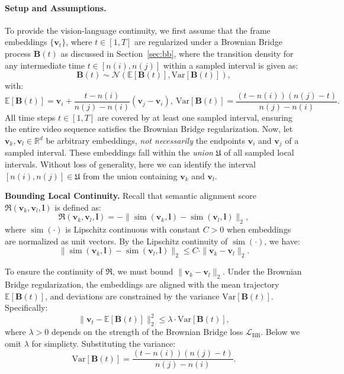 \paragraph{Setup and Assumptions.}
To provide the vision-language continuity, we first assume that the frame embeddings $\{\mathbf{v}_t\}$, where $t\in[1, T]$ are regularized under a Brownian Bridge process $\mathbf{B}(t)$ as discussed in Section~\ref{sec:bb}, where the transition density for any intermediate time $t \in [n(i), n(j)]$ within a sampled interval is given as:
\begin{equation}
\mathbf{B}(t) \sim \mathcal{N}\left(\mathbb{E}[\mathbf{B}(t)], \mathrm{Var}[\mathbf{B}(t)]\right),
\end{equation}
with:
\begin{equation}
\mathbb{E}[\mathbf{B}(t)] = \mathbf{v}_i + \frac{t - n(i)}{n(j) - n(i)} (\mathbf{v}_j - \mathbf{v}_i),~ \mathrm{Var}[\mathbf{B}(t)] = \frac{(t - n(i))(n(j) - t)}{n(j) - n(i)}.
\end{equation}
 All time steps \( t \in [1, T] \) are covered by at least one sampled interval, ensuring the entire video sequence satisfies the Brownian Bridge regularization. Now, let \( \mathbf{v}_k, \mathbf{v}_l \in\mathbb{R}^d\) be arbitrary embeddings, \textit{not necessarily} the endpoints \( \mathbf{v}_i \) and \( \mathbf{v}_j \) of a sampled interval. These embeddings fall within the \textit{union} $\mathfrak{U}$ of all sampled local intervals. Without loss of generality, here we can identify the interval \([n(i), n(j)]\in\mathfrak{U}\) from the union containing \( \mathbf{v}_k \) and \( \mathbf{v}_l \).


\noindent \textbf{Bounding Local Continuity.} Recall that semantic alignment score $\mathfrak{R}(\mathbf{v}_k, \mathbf{v}_l, \mathbf{l})$ is  defined as:
\[
\mathfrak{R}(\mathbf{v}_k, \mathbf{v}_l, \mathbf{l}) = -\|\operatorname{sim}(\mathbf{v}_k, \mathbf{l}) - \operatorname{sim}(\mathbf{v}_l, \mathbf{l})\|_2,
\]
where \( \operatorname{sim}(\cdot) \) is Lipschitz continuous with constant \( C > 0 \) when embeddings are normalized as unit vectors. By the Lipschitz continuity of \( \operatorname{sim}(\cdot) \), we have:
\[
\|\operatorname{sim}(\mathbf{v}_k, \mathbf{l}) - \operatorname{sim}(\mathbf{v}_l, \mathbf{l})\|_2 \leq C \cdot \|\mathbf{v}_k - \mathbf{v}_l\|_2.
\]

To ensure the continuity of \( \mathfrak{R} \), we must bound \( \|\mathbf{v}_k - \mathbf{v}_l\|_2 \). Under the Brownian Bridge regularization, the embeddings are aligned with the mean trajectory \( \mathbb{E}[\mathbf{B}(t)] \), and deviations are constrained by the variance \( \mathrm{Var}[\mathbf{B}(t)] \). Specifically:
\[
\|\mathbf{v}_t - \mathbb{E}[\mathbf{B}(t)]\|_2^2 \leq \lambda \cdot \mathrm{Var}[\mathbf{B}(t)],
\]
where \( \lambda > 0 \) depends on the strength of the Brownian Bridge loss \( \mathcal{L}_{\mathrm{BB}} \). Below we omit $\lambda$ for simplicty. Substituting the variance:
\[
\mathrm{Var}[\mathbf{B}(t)] = \frac{(t - n(i))(n(j) - t)}{n(j) - n(i)}.
\]

